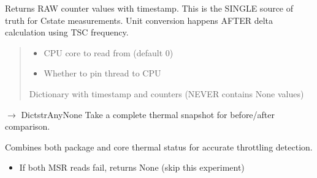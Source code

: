 \documentclass[letterpaper,10pt,english]{sphinxmanual}
\begin{document}
\begin{fulllineitems}
\begin{fulllineitems}
\sphinxAtStartPar
Returns RAW counter values with timestamp. This is the SINGLE source of truth
for C\sphinxhyphen{}state measurements. Unit conversion happens AFTER delta calculation
using TSC frequency.
\begin{quote}\begin{description}
\begin{itemize}
\item {} 
\sphinxAtStartPar
{} \textendash{} CPU core to read from (default 0)

\item {} 
\sphinxAtStartPar
{} \textendash{} Whether to pin thread to CPU

\end{itemize}

\sphinxAtStartPar
Dictionary with timestamp and counters (NEVER contains None values)

\end{description}\end{quote}

\end{fulllineitems}


\begin{fulllineitems}
\label{\detokenize{core.readers.msr_reader:core.readers.msr_reader.MSRReader.snapshot_thermal_state}}
\pysigstartsignatures
\pysiglinewithargsret
{}
{\sphinxparamcomma {}}
{{ $\rightarrow$ Dict\DUrole{p}{{[}}strAny\DUrole{p}{{]}}None}}
\pysigstopsignatures
\sphinxAtStartPar
Take a complete thermal snapshot for before/after comparison.

\sphinxAtStartPar
Combines both package and core thermal status for accurate throttling detection.
\begin{description}
\begin{itemize}
\item {} 
\sphinxAtStartPar
If both MSR reads fail, returns None (skip this experiment)


\end{itemize}
\end{description}
\end{fulllineitems}
\end{fulllineitems}
\end{document}
